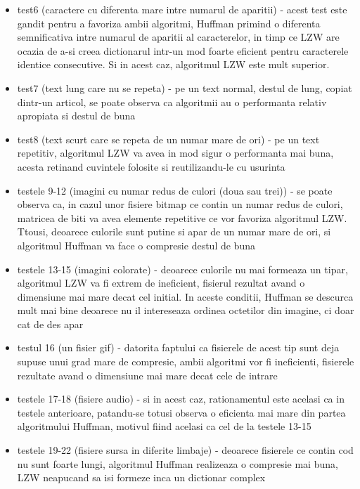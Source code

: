 \documentclass[runningheads]{llncs}
\begin{document}
\begin{itemize}
    \item test6 (caractere cu diferenta mare intre numarul de aparitii) - acest test este gandit pentru a favoriza ambii algoritmi,
    Huffman primind o diferenta semnificativa intre numarul de aparitii al caracterelor, in timp ce LZW are ocazia de a-si creea dictionarul
    intr-un mod foarte eficient pentru caracterele identice consecutive. Si in acest caz, algoritmul LZW este mult superior.

    \item test7 (text lung care nu se repeta) - pe un text normal, destul de lung, copiat dintr-un articol, se poate observa ca algoritmii au o performanta
    relativ apropiata si destul de buna
    \item test8 (text scurt care se repeta de un numar mare de ori) - pe un text repetitiv, algoritmul LZW va avea in mod sigur o performanta mai buna, acesta
    retinand cuvintele folosite si reutilizandu-le cu usurinta

    \item testele 9-12 (imagini cu numar redus de culori (doua sau trei)) - se poate observa ca, in cazul unor fisiere bitmap ce contin un numar redus de culori,
    matricea de biti va avea elemente repetitive ce vor favoriza algoritmul LZW. Ttousi, deoarece culorile sunt putine si apar de un numar mare de ori, si algoritmul
    Huffman va face o compresie destul de buna

    \item testele 13-15 (imagini colorate) - deoarece culorile nu mai formeaza un tipar, algoritmul LZW va fi extrem de ineficient, fisierul rezultat avand o dimensiune
    mai mare decat cel initial. In aceste conditii, Huffman se descurca mult mai bine deoarece nu il intereseaza ordinea octetilor din imagine, ci doar cat de des apar

    \item testul 16 (un fisier gif) - datorita faptului ca fisierele de acest tip sunt deja supuse unui grad mare de compresie, ambii algoritmi vor
    fi ineficienti, fisierele rezultate avand o dimensiune mai mare decat cele de intrare

    \item testele 17-18 (fisiere audio) - si in acest caz, rationamentul este acelasi ca in testele anterioare, patandu-se totusi observa o eficienta mai mare din partea
    algoritmului Huffman, motivul fiind acelasi ca cel de la testele 13-15

    \item testele 19-22 (fisiere sursa in diferite limbaje) - deoarece fisierele ce contin cod nu sunt foarte lungi, algoritmul Huffman realizeaza o compresie mai buna, 
    LZW neapucand sa isi formeze inca un dictionar complex
    

\end{itemize}
\end{document}
